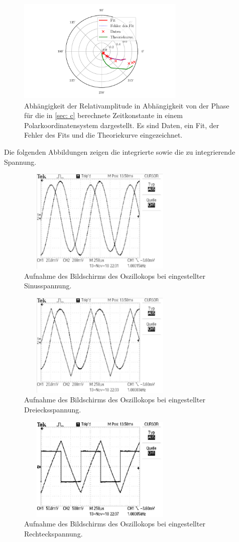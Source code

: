 \begin{figure}
  \centering
  \includegraphics[width=8cm, height=5cm]{build/plotd3.pdf}
  \caption{Abhängigkeit der Relativamplitude in Abhängigkeit von der Phase für die in \ref{sec: c} 
  berechnete Zeitkonstante in einem Polarkoordinatensystem dargestellt. Es sind Daten, ein Fit, der Fehler
  des Fits und die Theoriekurve eingezeichnet.}
  \label{fig: plotd3}
\end{figure}

Die folgenden Abbildungen zeigen die integrierte sowie die zu integrierende Spannung. %
\begin{figure}
  \centering
  \includegraphics[width=8cm, height=5cm]{build/integrator1.pdf}
  \caption{Aufnahme des Bildschirms des Oszillokops bei eingestellter Sinusspannung.}
  \label{fig: sinus}
\end{figure}

\begin{figure}
  \centering
  \includegraphics[width=8cm, height=5cm]{build/integrator2.pdf}
  \caption{Aufnahme des Bildschirms des Oszillokops bei eingestellter Dreiecksspannung.}
  \label{fig: dreieck}
\end{figure}

\begin{figure}
  \centering
  \includegraphics[width=8cm, height=5cm]{build/integrator3.pdf}
  \caption{Aufnahme des Bildschirms des Oszillokops bei eingestellter Rechteckspannung.}
  \label{fig: rechteck}
\end{figure}
